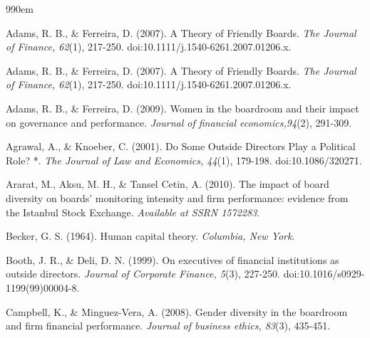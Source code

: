\normalsize \normalfont
\def\bibindent{0em}
\begin{thebibliography}{99\kern\bibindent}

\begin{singlespace}
Adams, R. B., \& Ferreira, D. (2007). A Theory of Friendly Boards. \emph{The Journal of Finance, 62}(1), 217-250. doi:10.1111/j.1540-6261.2007.01206.x.
\end{singlespace}

\begin{singlespace}
\hangindent=0.7cm Adams, R. B., \& Ferreira, D. (2007). A Theory of Friendly Boards. \emph{The Journal of Finance, 62}(1), 217-250. doi:10.1111/j.1540-6261.2007.01206.x.
\end{singlespace}

\begin{singlespace}
Adams, R. B., \& Ferreira, D. (2009). Women in the boardroom and their impact on governance and performance. \emph{Journal of financial economics,94}(2), 291-309.
\end{singlespace}

\begin{singlespace}
Agrawal, A., \& Knoeber, C. (2001). Do Some Outside Directors Play a Political Role? *. \emph{The Journal of Law and Economics, 44}(1), 179-198. doi:10.1086/320271.
\end{singlespace}

\begin{singlespace}
Ararat, M., Aksu, M. H., \& Tansel Cetin, A. (2010). The impact of board diversity on boards' monitoring intensity and firm performance: evidence from the Istanbul Stock Exchange. \emph{Available at SSRN 1572283}.
\end{singlespace}

\begin{singlespace}
Becker, G. S. (1964). Human capital theory. \emph{Columbia, New York}.
\end{singlespace}

\begin{singlespace}
Booth, J. R., \& Deli, D. N. (1999). On executives of financial institutions as outside directors. \emph{Journal of Corporate Finance, 5}(3), 227-250. doi:10.1016/s0929-1199(99)00004-8.
\end{singlespace}

\begin{singlespace}
Campbell, K., \& Minguez-Vera, A. (2008). Gender diversity in the boardroom and firm financial performance. \emph{Journal of business ethics, 83}(3), 435-451.
\end{singlespace}


\end{thebibliography}
